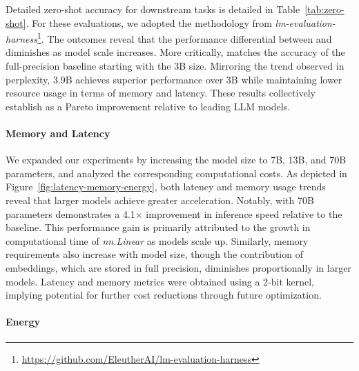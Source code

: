 Detailed zero-shot accuracy for downstream tasks is detailed in Table~\ref{tab:zero-shot}. For these evaluations, we adopted the methodology from \emph{lm-evaluation-harness}\footnote{\url{https://github.com/EleutherAI/lm-evaluation-harness}}. The outcomes reveal that the performance differential between  and  diminishes as model scale increases. More critically,  matches the accuracy of the full-precision baseline starting with the 3B size. Mirroring the trend observed in perplexity,  3.9B achieves superior performance over  3B while maintaining lower resource usage in terms of memory and latency. These results collectively establish  as a Pareto improvement relative to leading LLM models.

\paragraph{Memory and Latency}

We expanded our experiments by increasing the model size to 7B, 13B, and 70B parameters, and analyzed the corresponding computational costs. As depicted in Figure~\ref{fig:latency-memory-energy}, both latency and memory usage trends reveal that larger models achieve greater acceleration. Notably,  with 70B parameters demonstrates a 4.1$\times$ improvement in inference speed relative to the  baseline. This performance gain is primarily attributed to the growth in computational time of \emph{nn.Linear} as models scale up. Similarly, memory requirements also increase with model size, though the contribution of embeddings, which are stored in full precision, diminishes proportionally in larger models. Latency and memory metrics were obtained using a 2-bit kernel, implying potential for further cost reductions through future optimization.

\paragraph{Energy}

